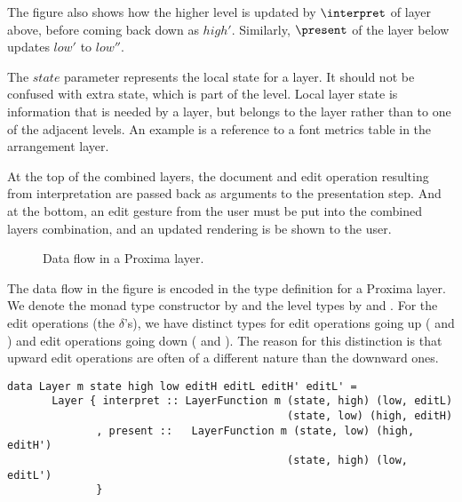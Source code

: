 \documentclass[preprint,natbib]{sigplanconf}
\begin{document}
The figure also shows how the higher level is updated by $\interpret$ of layer above, before coming back down as $high'$. Similarly, $\present$ of the layer below updates $low'$ to $low''$. 

The $state$ parameter represents the local state for a layer. It should not be confused with extra state, which is part of the level. Local layer state is information that is needed by a layer, but belongs to the layer rather than to one of the adjacent levels. An example is a reference to a font metrics table in the arrangement layer.

At the top of the combined layers, the document and edit operation resulting from interpretation are passed back as arguments to the presentation step. And at the bottom, an edit gesture from the user must be put into the combined layers combination, and an updated rendering is be shown to the user. 
 
\begin{figure}
\begin{small}
\begin{center}
\begin{center}
\end{center}\caption{Data flow in a Proxima layer.} \label{proximaDataFlow}
\end{center}
\end{small}
\end{figure}


The data flow in the figure is encoded in the type definition for a Proxima layer. We denote the monad type constructor by  and the level types by  and . For the edit operations (the $\delta$'s), we have distinct types for edit operations going up  ( and ) and edit operations going down ( and ). The reason for this distinction is that upward edit operations are often of a different nature than the downward ones.

\begin{small}
\begin{verbatim}
data Layer m state high low editH editL editH' editL' =
       Layer { interpret :: LayerFunction m (state, high) (low, editL)
                                            (state, low) (high, editH)
              , present ::   LayerFunction m (state, low) (high, editH')
                                            (state, high) (low, editL')
              }
\end{verbatim}
\end{small}
\end{document}
